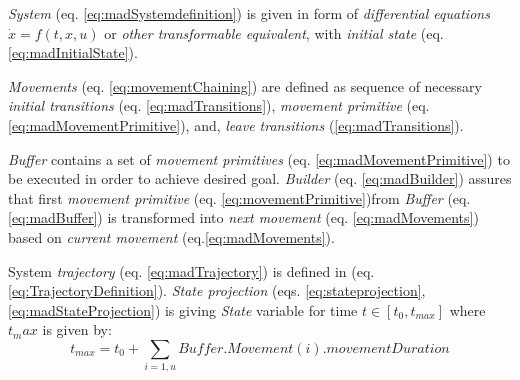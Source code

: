 \begin{definition}
    \noindent \emph{System} (eq. \ref{eq:madSystemdefinition}) is given in form of \emph{differential equations} $\dot{x} = f(t,x,u)$ or \emph{other transformable equivalent}, with \emph{initial state} (eq. \ref{eq:madInitialState}).
    
    \emph{Movements} (eq. \ref{eq:movementChaining}) are defined as sequence of necessary \emph{initial transitions} (eq. \ref{eq:madTransitions}), \emph{movement primitive} (eq. \ref{eq:madMovementPrimitive}), and, \emph{leave transitions} (\ref{eq:madTransitions}).
    
    \emph{Buffer} contains a set of \emph{movement primitives} (eq. \ref{eq:madMovementPrimitive}) to be executed in order to achieve desired goal. \emph{Builder} (eq. \ref{eq:madBuilder}) assures that first \emph{movement primitive} (eq. \ref{eq:movementPrimitive})from \emph{Buffer} (eq. \ref{eq:madBuffer}) is transformed into \emph{next movement} (eq. \ref{eq:madMovements}) based on \emph{current movement} (eq.\ref{eq:madMovements}).
    
    System \emph{trajectory} (eq. \ref{eq:madTrajectory}) is defined in (eq. \ref{eq:TrajectoryDefinition}). \emph{State projection} (eqs. \ref{eq:stateprojection},\ref{eq:madStateProjection}) is giving \emph{State} variable for time $t\in[t_0,t_{max}]$ where $t_max$ is given by:
    \begin{equation}
    t_{max}=t_0+\sum_{i=1,u}Buffer.Movement(i).movementDuration    
    \end{equation}
    \end{definition}
    